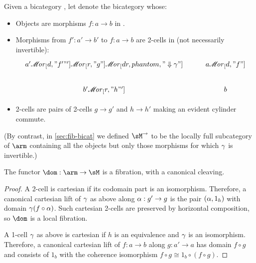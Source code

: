 \documentclass{amsart}
\def\ar#1{\mathscr{M}\!\mathit{or}_{#1}}
\begin{document}
\begin{defn}
  Given a bicategory \sM, let \arm denote the bicategory whose:
  \begin{itemize}
  \item Objects are morphisms $f:a\to b$ in \sM.
  \item Morphisms from $f':a'\to b'$ to $f:a\to b$ are 2-cells in \sM (not necessarily invertible):
    \[
    \begin{tikzcd}
      a' \ar[d,"f'"'] \ar[r,"g"] \ar[dr,phantom,"\Downarrow \gm"] & a \ar[d,"f"] \\
      b' \ar[r,"h"'] & b
    \end{tikzcd}
    \]
  \item 2-cells are pairs of 2-cells $g\to g'$ and $h\to h'$ making an evident cylinder commute.
  \end{itemize}
\end{defn}

(By contrast, in \cref{sec:fib-bicat} we defined $\sM^\to$ to be the locally full subcategory of $\arm$ containing all the objects but only those morphisms for which $\gamma$ is invertible.)

\begin{lem}
  The functor $\dom:\arm \to\sM$ is a fibration, with a canonical cleaving.
\end{lem}
\begin{proof}
  A 2-cell is cartesian if its codomain part is an isomorphism.
  Therefore, a canonical cartesian lift of $\gamma$ as above along $\alpha:g'\to g$ is the pair $(\alpha,1_h)$ with domain $\gamma(f\circ\alpha)$.
  Such cartesian 2-cells are preserved by horizontal composition, so $\dom$ is a local fibration.

  A 1-cell $\gamma$ as above is cartesian if $h$ is an equivalence and $\gamma$ is an isomorphism.
  Therefore, a canonical cartesian lift of $f:a\to b$ along $g:a'\to a$ has domain $f\circ g$ and consists of $1_b$ with the coherence isomorphism $f\circ g \cong 1_b\circ (f\circ g)$.
\end{proof}
\end{document}
